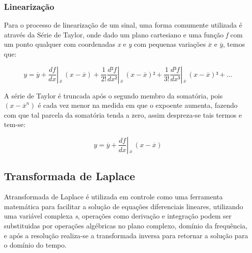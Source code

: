 \subsubsection{Linearização}

Para o processo de linearização de um sinal, uma forma comumente utilizada é através da Série de Taylor, onde dado um plano cartesiano e uma função \emph{f} com um ponto qualquer com coordenadas \emph{x} e \emph{y} com pequenas variações $\overline{x}$ e $\overline{y}$, temos que:

\begin{center}
\begin{equation}
y = \overline{y} + 
\frac{df}{dx} \left| \frac{ }{ } _{\overline{x}} \right. \, (x - \overline{x}) + 
\frac{1}{2!} \frac{d²f}{dx²} \left| \frac{ }{ } _{\overline{x}} \right. \, (x - \overline{x})² +
\frac{1}{3!} \frac{d³f}{dx³} \left| \frac{ }{ } _{\overline{x}} \right. \, (x - \overline{x})³ + ...
\label{eqn:SerieTaylor}
\end{equation}
\end{center}

A série de Taylor é truncada após o segundo membro da somatória, pois $(x - \overline{x}^n )$ é cada vez menor na medida em que o expoente aumenta, fazendo com que tal parcela da somatória tenda a zero, assim despreza-se tais termos e tem-se:

\begin{center}
\begin{equation}
y = \overline{y} + 
\frac{df}{dx} \left| \frac{ }{ } _{\overline{x}} \right. \, (x - \overline{x})
\label{eqn:SerieTaylorTruncada}
\end{equation}
\end{center}



\subsection{Transformada de Laplace}
 
Atransformada de Laplace é utilizada em controle como uma ferramenta matemática para facilitar a solução de equações diferenciais lineares, utilizando uma variável complexa \emph{s}, operações como derivação e integração podem ser substituidas por operações algébricas no plano complexo, domínio da frequência, e após a resolução realiza-se a transformada inversa para retornar a solução para o domínio do tempo.

